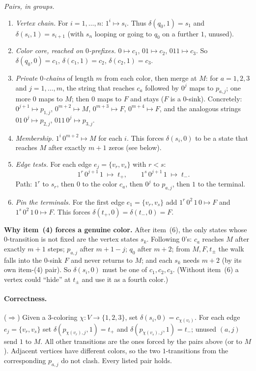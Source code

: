 \begin{soln}
\emph{Pairs, in groups.}
\begin{enumerate}
\item \emph{Vertex chain.} For $i=1,\dots,n$: $1^i\mapsto s_i$. Thus $\delta(q_0,1)=s_1$ and $\delta(s_i,1)=s_{i+1}$ (with $s_{n}$ looping or going to $q_0$ on a further $1$, unused).
\item \emph{Color core, reached on $0$-prefixes.}
$0\mapsto c_1$,\quad
$01\mapsto c_2$,\quad
$011\mapsto c_3$.
So $\delta(q_0,0)=c_1$, $\delta(c_1,1)=c_2$, $\delta(c_2,1)=c_3$.
\item \emph{Private $0$-chains} of length $m$ from each color, then merge at $M$:
for $a=1,2,3$ and $j=1,\dots,m$, the string that reaches $c_a$ followed by $0^j$ maps to $p_{a,j}$; one more $0$ maps to $M$; then $0$ maps to $F$ and stays ($F$ is a $0$-sink). Concretely:
$0^{j+1}\mapsto p_{1,j}$,\quad
$0^{m+2}\mapsto M$,\quad
$0^{m+3}\mapsto F$,\quad
$0^{m+4}\mapsto F$,
and the analogous strings $01\,0^j\mapsto p_{2,j}$, $011\,0^j\mapsto p_{3,j}$.
\item \emph{Membership.} $1^i\,0^{m+2}\mapsto M$ for each $i$. This forces $\delta(s_i,0)$ to be a state that reaches $M$ after exactly $m+1$ zeros (see below).
\item \emph{Edge tests.} For each edge $e_j=\{v_r,v_s\}$ with $r<s$:
\[
1^r\,0^{j+1}\,1\;\mapsto\; t_+,\qquad
1^s\,0^{j+1}\,1\;\mapsto\; t_-.
\]
Path: $1^r$ to $s_r$, then $0$ to the color $c_a$, then $0^j$ to $p_{a,j}$, then $1$ to the terminal.
\item \emph{Pin the terminals.} For the first edge $e_1=\{v_r,v_s\}$ add $1^r\,0^{2}\,1\,0\mapsto F$ and $1^s\,0^{2}\,1\,0\mapsto F$. This forces $\delta(t_+,0)=\delta(t_-,0)=F$.
\end{enumerate}

\textbf{Why item~(4) forces a genuine color.} After item~(6), the only states whose $0$-transition is not fixed are the vertex states $s_k$. Following $0$'s: $c_a$ reaches $M$ after exactly $m+1$ steps; $p_{a,j}$ after $m+1-j$; $q_0$ after $m+2$; from $M,F,t_\pm$ the walk falls into the $0$-sink $F$ and never returns to $M$; and each $s_k$ needs $m+2$ (by its own item-(4) pair). So $\delta(s_i,0)$ must be one of $c_1,c_2,c_3$. (Without item~(6) a vertex could ``hide'' at $t_\pm$ and use it as a fourth color.)

\paragraph{Correctness.}
($\Rightarrow$) Given a $3$-coloring $\chi\colon V\to\{1,2,3\}$, set $\delta(s_i,0)=c_{\chi(v_i)}$. For each edge $e_j=\{v_r,v_s\}$ set $\delta(p_{\chi(v_r),j},1)=t_+$ and $\delta(p_{\chi(v_s),j},1)=t_-$; unused $(a,j)$ send $1$ to $M$. All other transitions are the ones forced by the pairs above (or to $M$). Adjacent vertices have different colors, so the two $1$-transitions from the corresponding $p_{a,j}$ do not clash. Every listed pair holds.


\end{soln}
